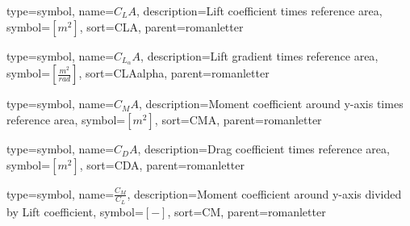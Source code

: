 {
type=symbol, %
name={\ensuremath{C_LA}}, %
description={Lift coefficient times reference area}, %
symbol={$\left[m^2\right]$}, %
sort=CLA, %
parent=romanletter %
}

{
	type=symbol, %
	name={\ensuremath{C_{L_\alpha}A}}, %
	description={Lift gradient times reference area}, %
	symbol={$\left[\frac{m^2}{rad}\right]$}, %
	sort=CLAalpha, %
	parent=romanletter %
}

{
	type=symbol, %
	name={\ensuremath{C_MA}}, %
	description={Moment coefficient around y-axis times reference area}, %
	symbol={$\left[m^2\right]$}, %
	sort=CMA, %
	parent=romanletter %
}

{
	type=symbol, %
	name={\ensuremath{C_DA}}, %
	description={Drag coefficient times reference area}, %
	symbol={$\left[m^2\right]$}, %
	sort=CDA, %
	parent=romanletter %
}

{
	type=symbol, %
	name={\ensuremath{\frac{C_M}{C_L}}}, %
	description={Moment coefficient around y-axis divided by Lift coefficient}, %
	symbol={$\left[-\right]$}, %
	sort=CM, %
	parent=romanletter %
}

